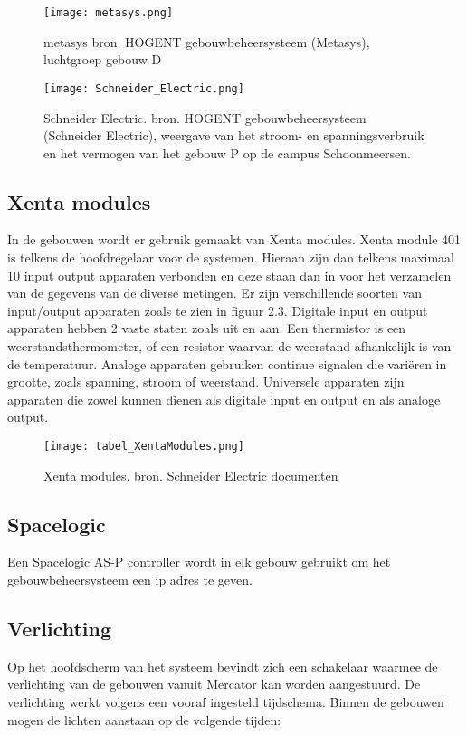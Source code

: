 \begin{figure}
    \centering
    \texttt{[image: metasys.png]}
    \caption[metasys bron. HOGENT gebouwbeheersysteem (Metasys)]{\label{fig:metasys}metasys bron. HOGENT gebouwbeheersysteem (Metasys), luchtgroep gebouw D}
\end{figure}
\begin{figure}
    \centering
    \texttt{[image: Schneider\_Electric.png]}
    \caption[Schneider Electric. bron. HOGENT gebouwbeheersysteem (Schneider Electric)]{\label{fig:schneiderelectric}Schneider Electric. bron. HOGENT gebouwbeheersysteem (Schneider Electric), weergave van het stroom- en spanningsverbruik en het vermogen van het gebouw P op de campus Schoonmeersen.}
\end{figure}

\subsection{Xenta modules}
In de gebouwen wordt er gebruik gemaakt van Xenta modules. Xenta module 401 is telkens de hoofdregelaar voor de systemen. Hieraan zijn dan telkens maximaal 10 input output apparaten verbonden en deze staan dan in voor het verzamelen van de gegevens van de diverse metingen. Er zijn verschillende soorten van input/output apparaten zoals te zien in figuur 2.3. Digitale input en output apparaten hebben 2 vaste staten zoals uit en aan. Een thermistor is een weerstandsthermometer, of een resistor waarvan de weerstand afhankelijk is van de temperatuur. Analoge apparaten gebruiken continue signalen die variëren in grootte, zoals spanning, stroom of weerstand. Universele apparaten zijn apparaten die zowel kunnen dienen als digitale input en output en als analoge output.

\begin{figure}
  \centering
  \texttt{[image: tabel\_XentaModules.png]}
  \caption[Xenta modules. bron. Schneider Electric documenten]{\label{fig:xentamodules}Xenta modules. bron. Schneider Electric documenten}
\end{figure}

\subsection{Spacelogic}
Een Spacelogic AS-P controller wordt in elk gebouw gebruikt om het gebouwbeheersysteem een ip adres te geven.


\subsection{Verlichting}
Op het hoofdscherm van het systeem bevindt zich een schakelaar waarmee de verlichting van de gebouwen vanuit Mercator kan worden aangestuurd. De verlichting werkt volgens een vooraf ingesteld tijdschema. Binnen de gebouwen mogen de lichten aanstaan op de volgende tijden:

